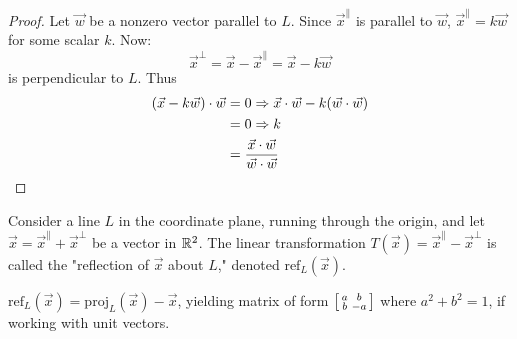 \documentclass[a4paper,11pt]{article}
\begin{document}
\begin{outline}
    \begin{proof}
      Let \(\vec{w}\) be a nonzero vector parallel to \(L\). Since \(\vec{x}^{\parallel}\) 
      is parallel to \(\vec{w}\),
      \(\vec{x}^{\parallel} = k\vec{w}\) for some scalar \(k\). Now:
      \[
        \vec{x}^{\perp} = \vec{x} - \vec{x}^{\parallel} = \vec{x} - k\vec{w}
      \]
      is perpendicular to \(L\). Thus
      \begin{align*}
        (\vec{x} - k\vec{w}) \cdot \vec{w} &= 0 \Rightarrow \vec{x}\cdot\vec{w} - k(\vec{w}\cdot\vec{w})\\
                                           &= 0 \Rightarrow k\\
                                           &= \frac{\vec{x}\cdot\vec{w}}{\vec{w}\cdot\vec{w}}
      \end{align*}
    \end{proof}

    Consider a line \(L\) in the coordinate plane, running through the origin, and let 
    \(\vec{x} = \vec{x}^{\parallel} + \vec{x}^{\perp}\) be a vector in \(\mathbb{R}^2\). The linear transformation
    \(T(\vec{x}) = \vec{x}^{\parallel} - \vec{x}^{\perp}\) is called the "reflection of \(\vec{x}\) about \(L\)," 
    denoted \(\text{ref}_{L}(\vec{x})\).
    
    \(\text{ref}_{L}(\vec{x}) = \text{proj}_{L}(\vec{x}) - \vec{x}\), yielding matrix of form 
    \(\begin{bsmallmatrix} a&b\\ b&-a \end{bsmallmatrix}\) where \(a^2 + b^2 = 1\), if working with unit vectors.
    

\end{outline}
\end{document}
